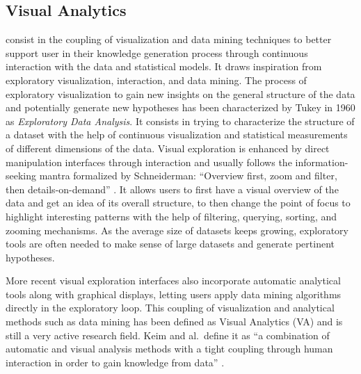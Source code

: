 \subsection{Visual Analytics}

\va consist in the coupling of visualization and data mining techniques to better support user in their knowledge generation process through continuous interaction with the data and statistical models\cite{thomasVisualAnalyticsAgenda2006}.
It draws inspiration from exploratory visualization, interaction, and data mining.
The process of exploratory visualization to gain new insights on the general structure of the data and potentially generate new hypotheses has been characterized by Tukey in 1960 as \emph{Exploratory Data Analysis}\cite{tukeyExploratoryDataAnalysis1977}.
It consists in trying to characterize the structure of a dataset with the help of continuous visualization and statistical measurements of different dimensions of the data.
Visual exploration is enhanced by direct manipulation interfaces through interaction and usually follows the information-seeking mantra formalized by Schneiderman: ``Overview first, zoom and filter, then details-on-demand'' \cite{shneidermanEyesHaveIt1996}.
It allows users to first have a visual overview of the data and get an idea of its overall structure, to then change the point of focus to highlight interesting patterns with the help of filtering, querying, sorting, and zooming mechanisms.
As the average size of datasets keeps growing, exploratory tools are often needed to make sense of large datasets and generate pertinent hypotheses.

More recent visual exploration interfaces also incorporate automatic analytical tools along with graphical displays, letting users apply data mining algorithms directly in the exploratory loop.
This coupling of visualization and analytical methods such as data mining has been defined as Visual Analytics (VA) and is still a very active research field.
Keim and al.\ define it as ``a combination of automatic and visual analysis methods with a tight coupling through human interaction in order to gain knowledge from data'' \cite{keimVisualAnalyticsDefinition2008}.


